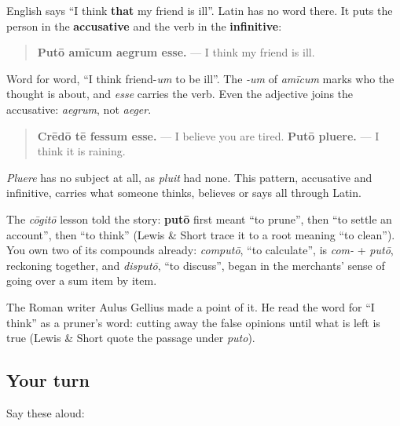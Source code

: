 \begin{grammarlens}[title={Grammar Lens: no word for \textquotedblleft{}that\textquotedblright{}}]
English says \textquotedblleft{}I think \textbf{that} my friend is ill\textquotedblright{}. Latin has no word there. It puts the person in the \textbf{accusative} and the verb in the \textbf{infinitive}:

\begin{quote}
\textbf{Putō amīcum aegrum esse.} — I think my friend is ill.
\end{quote}

Word for word, \textquotedblleft{}I think friend-\emph{um} to be ill\textquotedblright{}. The \emph{-um} of \emph{amīcum} marks who the thought is about, and \emph{esse} carries the verb. Even the adjective joins the accusative: \emph{aegrum}, not \emph{aeger}.

\begin{quote}
\textbf{Crēdō tē fessum esse.} — I believe you are tired. \textbf{Putō pluere.} — I think it is raining.
\end{quote}

\emph{Pluere} has no subject at all, as \emph{pluit} had none. This pattern, accusative and infinitive, carries what someone thinks, believes or says all through Latin.
\end{grammarlens}

\begin{cousinweb}
The \emph{cōgitō} lesson told the story: \textbf{putō} first meant \textquotedblleft{}to prune\textquotedblright{}, then \textquotedblleft{}to settle an account\textquotedblright{}, then \textquotedblleft{}to think\textquotedblright{} (Lewis \& Short trace it to a root meaning \textquotedblleft{}to clean\textquotedblright{}). You own two of its compounds already: \emph{computō}, \textquotedblleft{}to calculate\textquotedblright{}, is \emph{com-} + \emph{putō}, reckoning together, and \emph{disputō}, \textquotedblleft{}to discuss\textquotedblright{}, began in the merchants' sense of going over a sum item by item.

The Roman writer Aulus Gellius made a point of it. He read the word for \textquotedblleft{}I think\textquotedblright{} as a pruner's word: cutting away the false opinions until what is left is true (Lewis \& Short quote the passage under \emph{puto}).
\end{cousinweb}

\subsection*{Your turn}
Say these aloud:

